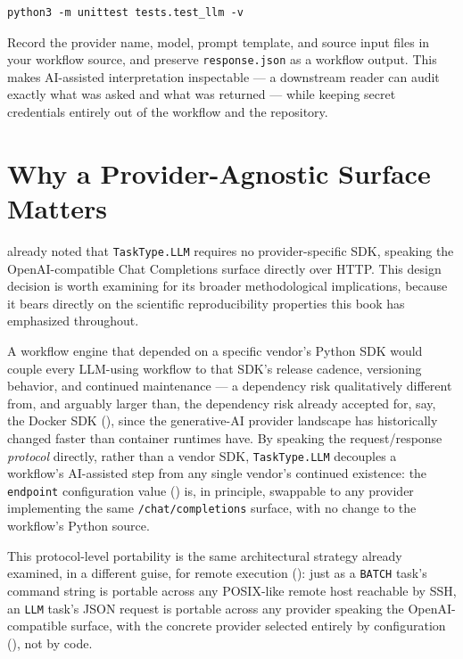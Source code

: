 \begin{lstlisting}[style=bash]
python3 -m unittest tests.test_llm -v
\end{lstlisting}

\begin{practicebox}
Record the provider name, model, prompt template, and source input files in
your workflow source, and preserve \texttt{response.json} as a workflow
output. This makes AI-assisted interpretation inspectable --- a downstream
reader can audit exactly what was asked and what was returned --- while
keeping secret credentials entirely out of the workflow and the repository.
\end{practicebox}

\section{Why a Provider-Agnostic Surface Matters}

 already noted that \texttt{TaskType.LLM} requires no
provider-specific SDK, speaking the OpenAI-compatible Chat Completions
surface directly over HTTP. This design decision is worth examining for its
broader methodological implications, because it bears directly on the
scientific reproducibility properties this book has emphasized throughout.

A workflow engine that depended on a specific vendor's Python SDK would
couple every LLM-using workflow to that SDK's release cadence, versioning
behavior, and continued maintenance --- a dependency risk qualitatively
different from, and arguably larger than, the dependency risk already
accepted for, say, the Docker SDK (), since the
generative-AI provider landscape has historically changed faster than
container runtimes have. By speaking the request/response \emph{protocol}
directly, rather than a vendor SDK, \texttt{TaskType.LLM} decouples a
workflow's AI-assisted step from any single vendor's continued existence:
the \texttt{endpoint} configuration value () is, in
principle, swappable to any provider implementing the same
\texttt{/chat/completions} surface, with no change to the workflow's Python
source.

\begin{practicebox}
This protocol-level portability is the same architectural strategy already
examined, in a different guise, for remote execution
(): just as a \texttt{BATCH} task's command
string is portable across any POSIX-like remote host reachable by SSH, an
\texttt{LLM} task's JSON request is portable across any provider speaking
the OpenAI-compatible surface, with the concrete provider selected entirely
by configuration (), not by code.
\end{practicebox}

